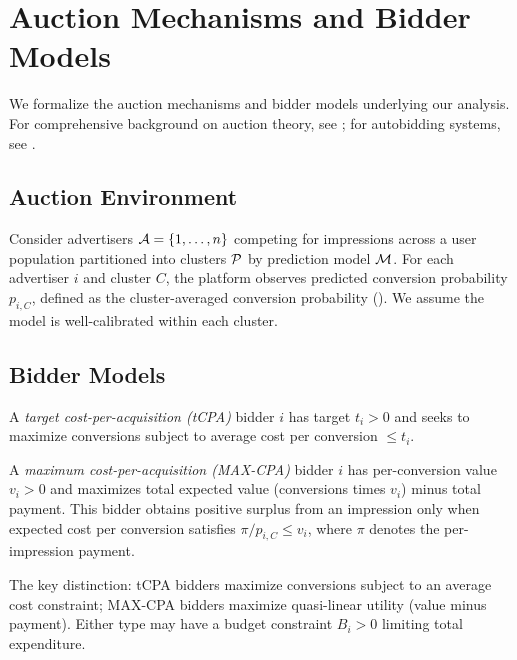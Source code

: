 
\section{Auction Mechanisms and Bidder Models}
\label{sec:auctions}

We formalize the auction mechanisms and bidder models underlying our analysis. For comprehensive background on auction theory, see \citet{krishna2009auction}; for autobidding systems, see \citet{aggarwal2019autobidding}.

\subsection{Auction Environment}

Consider advertisers $\mathcal{A} = \{1, \ldots, n\}$ competing for impressions across a user population partitioned into clusters $\mathcal{P}$ by prediction model $\mathcal{M}$. For each advertiser $i$ and cluster $C$, the platform observes predicted conversion probability $p_{i,C}$, defined as the cluster-averaged conversion probability (). We assume the model is well-calibrated within each cluster.

\subsection{Bidder Models}

\begin{definition}
\label{def:tcpa}
A \emph{target cost-per-acquisition (tCPA)} bidder $i$ has target $t_i > 0$ and seeks to maximize conversions subject to average cost per conversion $\leq t_i$.
\end{definition}

\begin{definition}
\label{def:maxcpa}
A \emph{maximum cost-per-acquisition (MAX-CPA)} bidder $i$ has per-conversion value $v_i > 0$ and maximizes total expected value (conversions times $v_i$) minus total payment. This bidder obtains positive surplus from an impression only when expected cost per conversion satisfies $\pi/p_{i,C} \leq v_i$, where $\pi$ denotes the per-impression payment.
\end{definition}

The key distinction: tCPA bidders maximize conversions subject to an average cost constraint; MAX-CPA bidders maximize quasi-linear utility (value minus payment). Either type may have a budget constraint $B_i > 0$ limiting total expenditure.

